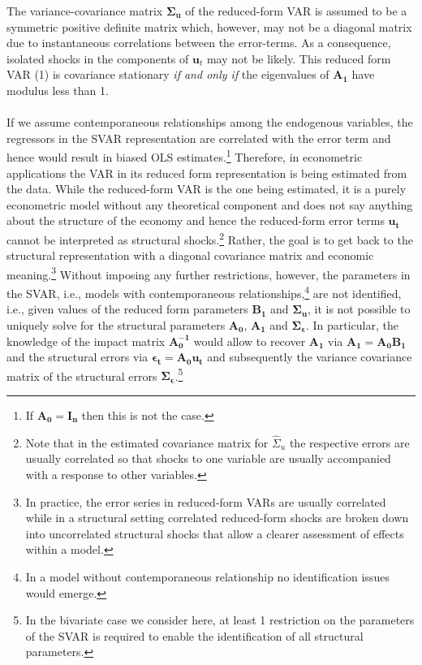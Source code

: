 \documentclass[a4paper,11pt,listof=nochaptergap,oneside,pointednumbers,bibtotoc,bigheadings,liststotoc]{scrbook}
\theoremstyle{mysatz}
\theoremstyle{mydefinition}
\theoremstyle{mybemerkung}
\newcommand{\vect}[1]{\boldsymbol{\mathbf{#1}}}
\begin{document}
The variance-covariance matrix $\vect{\Sigma_u}$ of the reduced-form VAR is assumed to be a symmetric positive definite matrix which, however, may not be a diagonal matrix due to instantaneous correlations between the error-terms. As a consequence, isolated shocks in the components of $\vect{u}_t$ may not be likely. This reduced form VAR (1) is covariance stationary \textit{if and only if} the eigenvalues of $\vect{A_1}$ have modulus less than 1. \\
\\
If we assume contemporaneous relationships among the endogenous variables, the regressors in the SVAR representation are correlated with the error term and hence would result in biased OLS estimates.\footnote{If $\vect{A_0} = \vect{I_n}$ then this is not the case.} Therefore, in econometric applications the VAR in its reduced form representation is being estimated from the data. While the reduced-form VAR is the one being estimated, it is a purely econometric model without any theoretical component and does not say anything about the structure of the economy and hence the reduced-form error terms $\vect{u_t}$ cannot be interpreted as structural shocks.\footnote{Note that in the estimated covariance matrix for ${\hat{\Sigma}_u}$ the respective errors are usually correlated so that shocks to one variable are usually accompanied with a response to other variables.} Rather, the goal is to get back to the structural representation with a diagonal covariance matrix and economic meaning.\footnote{In practice, the error series in reduced-form VARs are usually correlated while in a structural setting correlated reduced-form shocks are broken down into uncorrelated structural shocks that allow a clearer assessment of effects within a model.} Without imposing any further restrictions, however, the parameters in the SVAR, i.e., models with contemporaneous relationships,\footnote{In a model without contemporaneous relationship no identification issues would emerge.} are not identified, i.e., given values of the reduced form parameters $\vect{B_1}$ and $\vect{\Sigma_u}$, it is not possible to uniquely solve for the structural parameters $\vect{A_0}$, $\vect{A_1}$ and $\vect{\Sigma_\epsilon}$. In particular, the knowledge of the impact matrix $\vect{A_0^{-1}}$ would allow to recover $\vect{A_1}$ via $\vect{A_1} = \vect{A_0}\vect{B_1}$ and the structural errors via $\vect{\epsilon_t} = \vect{A_0}\vect{u_t}$ and subsequently the variance covariance matrix of the structural errors $\vect{\Sigma_\epsilon}$.\footnote{In the bivariate case we consider here, at least 1 restriction on the parameters of the SVAR is required to enable the identification of all structural parameters. }\\
\end{document}
